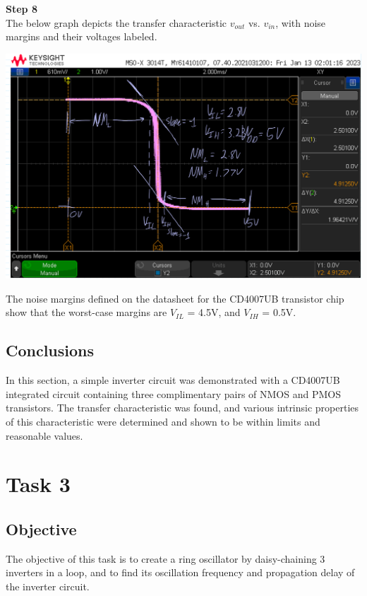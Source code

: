 \documentclass[notitlepage, 12pt]{report}  %
\begin{document}
\vspace{7pt}

\textbf{Step 8}\\

The below graph depicts the transfer characteristic ${v_{out}}$ vs. $v_{in}$, with noise margins and their voltages
labeled.\\

\begin{center}
    \includegraphics[scale=0.4]{scope4.png}
\end{center}

The noise margins defined on the datasheet for the CD4007UB transistor chip show that the worst-case margins 
are $V_{IL}$ = 4.5V, and $V_{IH}$ = 0.5V.\\

\subsection*{Conclusions}

\indent\indent In this section, a simple inverter circuit was demonstrated with a CD4007UB integrated circuit containing
three complimentary pairs of NMOS and PMOS transistors. The transfer characteristic was found, and various intrinsic properties 
of this characteristic were determined and shown to be within limits and reasonable values. \\

\section*{Task 3}

\subsection*{Objective}
\indent\indent The objective of this task is to create a ring oscillator by daisy-chaining 3 inverters in a loop, 
and to find its oscillation frequency and propagation delay of the inverter circuit.\\
\end{document}
